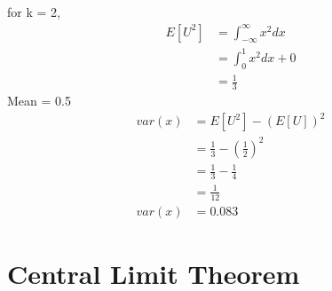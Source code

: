 \documentclass[journal,12pt,twocolumn]{IEEEtran}
\providecommand{\sbrak}[1]{\ensuremath{{}\left[#1\right]}}
\theoremstyle{remark}
\numberwithin{equation}{section}
\begin{document}
for k = 2,
\begin{align}
	E\sbrak{U^2} &= \int_{-\infty}^{\infty}x^2dx \\
	 &= \int_{0}^{1}x^2dx + 0 \\
	 &= \frac{1}{3}
\end{align}
Mean = 0.5 \\
\begin{align}
	var(x) &= E[U^2] - (E\sbrak{U})^2 \\
	 &= \frac{1}{3} - \left(\frac{1}{2}\right)^2 \\
	 &= \frac{1}{3} - \frac{1}{4} \\
	 &= \frac{1}{12} \\
	 var(x) &= 0.083
\end{align}
\section{Central Limit Theorem}
%
\end{document}
